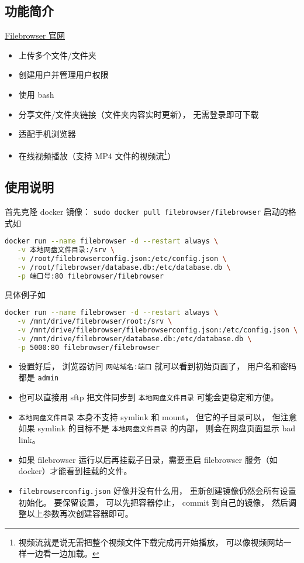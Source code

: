 
\subsection{功能简介}

\href{https://filebrowser.org/}{Filebrowser 官网}

\begin{itemize}
\item 上传多个文件/文件夹
\item 创建用户并管理用户权限
\item 使用 bash
\item 分享文件/文件夹链接（文件夹内容实时更新）， 无需登录即可下载
\item 适配手机浏览器
\item 在线视频播放（支持 MP4 文件的视频流\footnote{视频流就是说无需把整个视频文件下载完成再开始播放， 可以像视频网站一样一边看一边加载。}）
\end{itemize}

\subsection{使用说明}

首先克隆 docker 镜像： \verb`sudo docker pull filebrowser/filebrowser`
启动的格式如
\begin{lstlisting}[language=bash]
docker run --name filebrowser -d --restart always \
   -v 本地网盘文件目录:/srv \
   -v /root/filebrowserconfig.json:/etc/config.json \
   -v /root/filebrowser/database.db:/etc/database.db \
   -p 端口号:80 filebrowser/filebrowser
\end{lstlisting}
具体例子如 %
\begin{lstlisting}[language=bash]
docker run --name filebrowser -d --restart always \
   -v /mnt/drive/filebrowser/root:/srv \
   -v /mnt/drive/filebrowser/filebrowserconfig.json:/etc/config.json \
   -v /mnt/drive/filebrowser/database.db:/etc/database.db \
   -p 5000:80 filebrowser/filebrowser
\end{lstlisting}

\begin{itemize}
\item 设置好后， 浏览器访问 \verb`网站域名:端口` 就可以看到初始页面了， 用户名和密码都是 \verb`admin`
\item 也可以直接用 sftp 把文件同步到 \verb`本地网盘文件目录` 可能会更稳定和方便。
\item \verb`本地网盘文件目录` 本身不支持 symlink 和 mount， 但它的子目录可以， 但注意如果 symlink 的目标不是 \verb`本地网盘文件目录` 的内部， 则会在网盘页面显示 bad link。
\item 如果 filebrowser 运行以后再挂载子目录，需要重启 filebrowser 服务（如 docker）才能看到挂载的文件。
\item \verb`filebrowserconfig.json` 好像并没有什么用， 重新创建镜像仍然会所有设置初始化。 要保留设置， 可以先把容器停止， commit 到自己的镜像， 然后调整以上参数再次创建容器即可。
\end{itemize}

